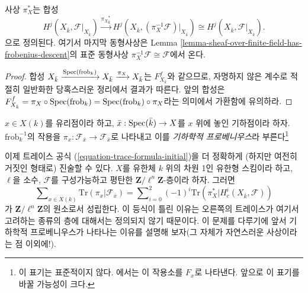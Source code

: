 \noindent
사상 $\pi_X^*$는 합성
$$
H^j(X_{\bar k}, \mathcal{F}|_{X_{\bar k}}) \xrightarrow{{\pi_X}_{\bar k}^*}
H^j(X_{\bar k}, (\pi_X^{-1} \mathcal{F})|_{X_{\bar k}}) \cong
H^j(X_{\bar k}, \mathcal{F}|_{X_{\bar k}}).
$$
으로 정의된다. 여기서 마지막 동형사상은 Lemma
\ref{lemma-sheaf-over-finite-field-has-frobenius-descent}의 표준
동형사상 $\pi_X^{-1} \mathcal{F} \cong \mathcal{F}$에서 온다.

\begin{proof}
합성 $X_{\bar k} \xrightarrow{\mathop{\mathrm{Spec}}(\text{frob}_k)} X_{\bar k}
\xrightarrow{\pi_X} X_{\bar k}$는 $F_{X_{\bar k}}^f$와 같으므로,
자명하지 않은 계수로 적절히 일반화한 당혹스러운 정리에서 결과가 따른다.
앞의 합성은
$F_{X_{\bar k}}^f = \pi_X \circ \mathop{\mathrm{Spec}}(\text{frob}_k) =
\mathop{\mathrm{Spec}}(\text{frob}_k) \circ \pi_X$라는 의미에서 가환함에 유의하라.
\end{proof}

\begin{definition}
\label{definition-geometric-frobenius-on-stalk}
$x \in X(k)$를 유리점이라 하고, $\bar x : \mathop{\mathrm{Spec}}(\bar k) \to X$를
$x$ 위에 놓인 기하점이라 하자. $\text{frob}_k^{-1}$의 작용을
$\pi_x : \mathcal{F}_{\bar x} \to \mathcal{F}_{\bar x}$로 나타내고 이를
{\it 기하학적 프로베니우스}라 부른다\footnote{이 표기는 표준적이지 않다.
\cite{SGA4.5}에서는 이 작용소를 $F_x$로 나타낸다. 앞으로 이 표기를
바꿀 가능성이 크다.}
\end{definition}

\noindent
이제 트레이스 공식 (\ref{equation-trace-formula-initial})을 더 정확하게
(하지만 여전히 거짓인 형태로) 진술할 수 있다. $X$를 유한체 $k$ 위의
차원 1인 유한형 스킴이라 하고, $\ell$을 소수, $\mathcal{F}$를
구성가능하고 평탄한 $\mathbf{Z}/\ell^n\mathbf{Z}$-층이라 하자. 그러면
\begin{equation}
\label{equation-trace-formula-second}
\sum\nolimits_{x \in X(k)}
\text{Tr}(\pi_x | \mathcal{F}_{\bar x})
=
\sum\nolimits_{i = 0}^2
(-1)^i \text{Tr}(\pi_X^* | H^i_c(X_{\bar k}, \mathcal{F}))
\end{equation}
가 $\mathbf{Z}/\ell^n\mathbf{Z}$의 원소로서 성립한다. 이 등식이 틀린
이유는 오른쪽의 트레이스가 여기서 고려하는 종류의 층에 대해서는
정의되지 않기 때문이다. 이 문제를 다루기에 앞서 기하학적 프로베니우스가
나타나는 이유를 설명해 보자(그 자체가 자연스러운 사상이라는 점 이외에!).

